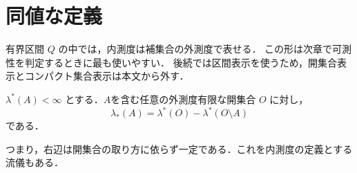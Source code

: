 \section{同値な定義}


有界区間 $Q$ の中では，内測度は補集合の外測度で表せる．
この形は次章で可測性を判定するときに最も使いやすい．
\iffalse
後続では区間表示を使うため，開集合表示とコンパクト集合表示は本文から外す．

\begin{theorem} \label{thm:inner-measure-via-open-set}
    $\lambda^*(A) < \infty$ とする．$A$を含む任意の外測度有限な開集合 $O$ に対し，
    \[
    \lambda_*(A) = \lambda^*(O) - \lambda^*(O \setminus A)
    \]
    である．
\end{theorem}
つまり，右辺は開集合の取り方に依らず一定である．これを内測度の定義とする流儀もある．

